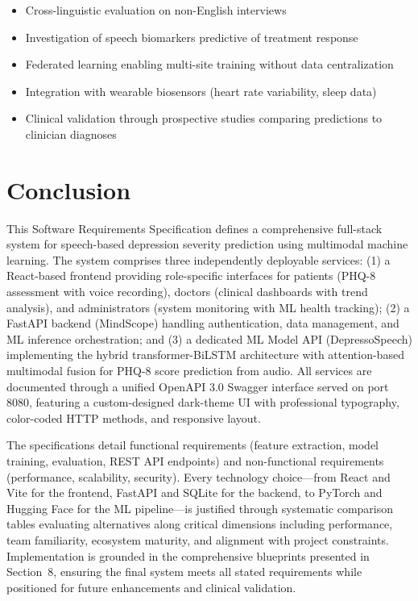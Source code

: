\documentclass[12pt]{article}
\begin{document}
	\begin{itemize}
		\item Cross-linguistic evaluation on non-English interviews
		\item Investigation of speech biomarkers predictive of treatment response
		\item Federated learning enabling multi-site training without data centralization
		\item Integration with wearable biosensors (heart rate variability, sleep data)
		\item Clinical validation through prospective studies comparing predictions to clinician diagnoses
	\end{itemize}


	\section{Conclusion}

	This Software Requirements Specification defines a comprehensive full-stack system for speech-based depression severity prediction using multimodal machine learning. The system comprises three independently deployable services: (1) a React-based frontend providing role-specific interfaces for patients (PHQ-8 assessment with voice recording), doctors (clinical dashboards with trend analysis), and administrators (system monitoring with ML health tracking); (2) a FastAPI backend (MindScope) handling authentication, data management, and ML inference orchestration; and (3) a dedicated ML Model API (DepressoSpeech) implementing the hybrid transformer-BiLSTM architecture with attention-based multimodal fusion for PHQ-8 score prediction from audio. All services are documented through a unified OpenAPI 3.0 Swagger interface served on port 8080, featuring a custom-designed dark-theme UI with professional typography, color-coded HTTP methods, and responsive layout.

	The specifications detail functional requirements (feature extraction, model training, evaluation, REST API endpoints) and non-functional requirements (performance, scalability, security). Every technology choice---from React and Vite for the frontend, FastAPI and SQLite for the backend, to PyTorch and Hugging Face for the ML pipeline---is justified through systematic comparison tables evaluating alternatives along critical dimensions including performance, team familiarity, ecosystem maturity, and alignment with project constraints. Implementation is grounded in the comprehensive blueprints presented in Section~8, ensuring the final system meets all stated requirements while positioned for future enhancements and clinical validation.
\end{document}
